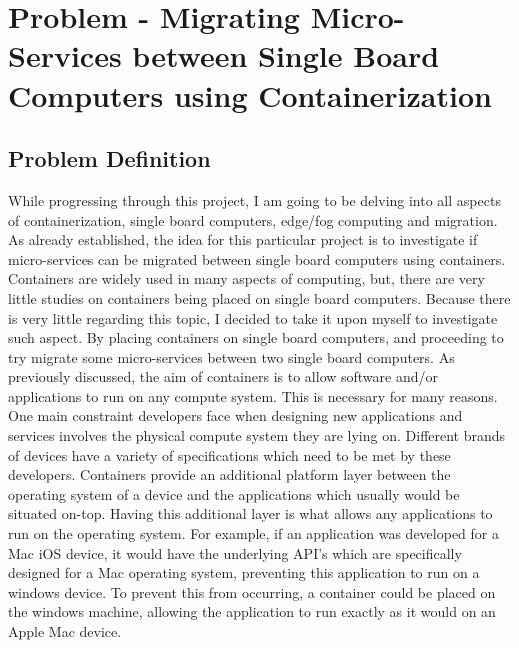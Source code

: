 
\chapter{Problem - Migrating Micro-Services between Single Board Computers using 
Containerization }
\label{chap:problem}

\section{Problem Definition}
While progressing through this project, I am going to be delving into all aspects of containerization, single board computers, edge/fog computing and migration. As already established, the idea for this particular project is to investigate if micro-services can be migrated between single board computers using containers. Containers are widely used in many aspects of computing, but, there are very little studies on containers being placed on single board computers. Because there is very little regarding this topic, I decided to take it upon myself to investigate such aspect. By placing containers on single board computers, and proceeding to try migrate some micro-services between two single board computers. As previously discussed, the aim of containers is to allow software and/or applications to run on any compute system. This is necessary for many reasons. One main constraint developers face when designing new applications and services involves the physical compute system they are lying on. Different brands of devices have a variety of specifications which need to be met by these developers. Containers provide an additional platform layer between the operating system of a device and the applications which usually would be situated on-top. Having this additional layer is what allows any applications to run on the operating system. For example, if an application was developed for a Mac iOS device, it would have the underlying API's which are specifically designed for a Mac operating system, preventing this application to run on a windows device. To prevent this from occurring, a container could be placed on the windows machine, allowing the application to run exactly as it would on an Apple Mac device. 

